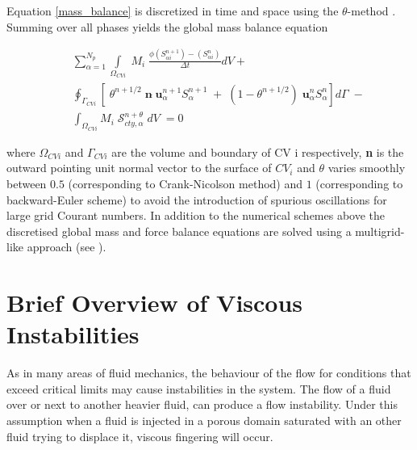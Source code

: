 \documentclass[preprint,authoryear,12pt]{elsarticle}
\begin{document}
Equation \ref{mass_balance} is discretized in time and space using the $\theta$-method \citep{saramito_1994}. Summing over all phases yields the global mass balance equation %

\begin{eqnarray}
 && \sum_{\alpha=1}^{N_{p}} \int\limits_{\Omega_{CVi}} \; M_{i} \; \frac{\phi\left(S_{\alpha i}^{n+1}\right)-\left(S_{\alpha i}^{n}\right)}{\Delta t} dV  + \nonumber\\
 &&  \oint_{\Gamma_{CVi}} [\; \theta^{n+1/2}\; {\mathbf n}\dot \; {\mathbf u}_{\alpha}^{n+1}S_{\alpha}^{n+1} \; + \; (1-\theta^{n+1/2}) \; {\mathbf u}_{\alpha}^{n}S_{\alpha}^{n}] d\Gamma \;- \nonumber\\
 &&  \int_{\Omega_{CVi}} M_{i} \; \mathcal{S}_{cty,\alpha}^{n+\theta} \; dV\; =0
\label{global_mass_balance}
\end{eqnarray}

\noindent where $\Omega_{CVi}$ and $\Gamma_{CVi}$ are the volume and boundary of CV i respectively, \textbf{n} is the outward pointing unit normal vector to the surface of $CV_{i}$ and $\theta$ varies smoothly between $0.5$ (corresponding to Crank-Nicolson method) and $1$ (corresponding to backward-Euler scheme) to avoid the introduction of spurious oscillations for large grid Courant numbers. In addition to the numerical schemes above the discretised global mass and force balance equations are solved using a multigrid-like approach (see \citet{pavlidis2016}).


\section{Brief Overview of Viscous Instabilities}\label{section:ViscousInstabilities}
\medskip
As in many areas of fluid mechanics, the behaviour of the flow for conditions that exceed critical limits may cause instabilities in the system. The flow of a fluid over or next to another heavier fluid, can produce a flow instability. Under this assumption when a fluid is injected in a porous domain saturated with an other fluid trying to displace it, viscous fingering will occur. 
\end{document}
